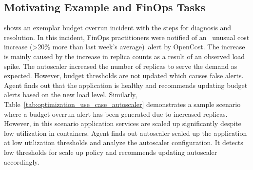\subsection{Motivating Example and FinOps Tasks}
\label{ss:finops-tasks}
 shows an exemplar budget overrun incident with the steps for diagnosis and resolution. 
In this incident, FinOps practitioners were notified of an ~\textemdash unusual cost increase (>20\% more than last week's average)~\textemdash alert by OpenCost.
The increase is mainly caused by the increase in replica counts as a result of an observed load spike.
The autoscaler increased the number of replicas to serve the demand as expected.
However, budget thresholds are not updated which causes false alerts. 
Agent finds out that the application is healthy and recommends updating budget alerts based on the new load level. 
Similarly, Table~\ref{tab:optimization_use_case_autoscaler} demonstrates a sample scenario where a budget overrun alert has been generated due to increased replicas. 
However, in this scenario application services are scaled up significantly despite low utilization in containers. 
Agent finds out autoscaler scaled up the application at low utilization thresholds and analyze the autoscaler configuration. 
It detects low thresholds for scale up policy and recommends updating autoscaler accordingly. 




